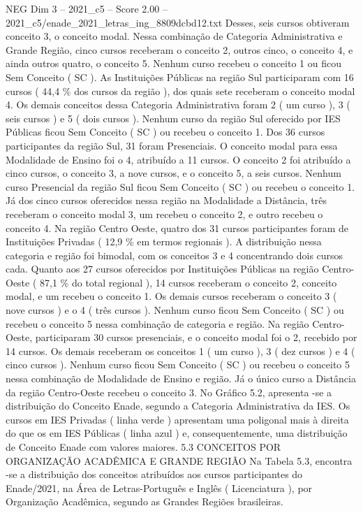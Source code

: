 \begin{textsample}{NEG Dim 3 – 2021\_c5 – Score 2.00 – 2021\_c5/enade\_2021\_letras\_ing\_8809dcbd12.txt}
Desses, seis cursos obtiveram conceito 3, o conceito modal.
Nessa combinação de Categoria Administrativa e Grande Região, cinco cursos receberam o conceito 2, outros cinco, o conceito 4, e ainda outros quatro, o conceito 5.
Nenhum curso recebeu o conceito 1 ou ficou Sem Conceito ( SC ).
As Instituições Públicas na região Sul participaram com 16 cursos ( 44,4 \% dos cursos da região ), dos quais sete receberam o conceito modal 4.
Os demais conceitos dessa Categoria Administrativa foram 2 ( um curso ), 3 ( seis cursos ) e 5 ( dois cursos ).
Nenhum curso da região Sul oferecido por IES Públicas ficou Sem Conceito ( SC ) ou recebeu o conceito 1.
Dos 36 cursos participantes da região Sul, 31 foram Presenciais.
O conceito modal para essa Modalidade de Ensino foi o 4, atribuído a 11 cursos.
O conceito 2 foi atribuído a cinco cursos, o conceito 3, a nove cursos, e o conceito 5, a seis cursos.
Nenhum curso Presencial da região Sul ficou Sem Conceito ( SC ) ou recebeu o conceito 1.
Já dos cinco cursos oferecidos nessa região na Modalidade a Distância, três receberam o conceito modal 3, um recebeu o conceito 2, e outro recebeu o conceito 4.
Na região Centro Oeste, quatro dos 31 cursos participantes foram de Instituições Privadas ( 12,9 \% em termos regionais ).
A distribuição nessa categoria e região foi bimodal, com os conceitos 3 e 4 concentrando dois cursos cada.
Quanto aos 27 cursos oferecidos por Instituições Públicas na região Centro-Oeste ( 87,1 \% do total regional ), 14 cursos receberam o conceito 2, conceito modal, e um recebeu o conceito 1.
Os demais cursos receberam o conceito 3 ( nove cursos ) e o 4 ( três cursos ).
Nenhum curso ficou Sem Conceito ( SC ) ou recebeu o conceito 5 nessa combinação de categoria e região.
Na região Centro-Oeste, participaram 30 cursos presenciais, e o conceito modal foi o 2, recebido por 14 cursos.
Os demais receberam os conceitos 1 ( um curso ), 3 ( dez cursos ) e 4 ( cinco cursos ).
Nenhum curso ficou Sem Conceito ( SC ) ou recebeu o conceito 5 nessa combinação de Modalidade de Ensino e região.
Já o único curso a Distância da região Centro-Oeste recebeu o conceito 3.
No Gráfico 5.2, apresenta -se a distribuição do Conceito Enade, segundo a Categoria Administrativa da IES.
Os cursos em IES Privadas ( linha verde ) apresentam uma poligonal mais à direita do que os em IES Públicas ( linha azul ) e, consequentemente, uma distribuição de Conceito Enade com valores maiores. 5.3 CONCEITOS POR ORGANIZAÇÃO ACADÊMICA E GRANDE REGIÃO Na Tabela 5.3, encontra -se a distribuição dos conceitos atribuídos aos cursos participantes do Enade/2021, na Área de Letras-Português e Inglês ( Licenciatura ), por Organização Acadêmica, segundo as Grandes Regiões brasileiras.

\end{textsample}

